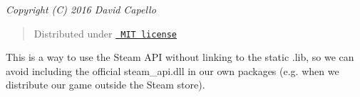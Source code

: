 {\itshape Copyright (C) 2016 David Capello}

\begin{quote}
Distributed under \href{LICENSE.txt}{\texttt{ MIT license}} \end{quote}
This is a way to use the Steam API without linking to the static {\ttfamily .lib}, so we can avoid including the official {\ttfamily steam\+\_\+api.\+dll} in our own packages (e.\+g. when we distribute our game outside the Steam store). 